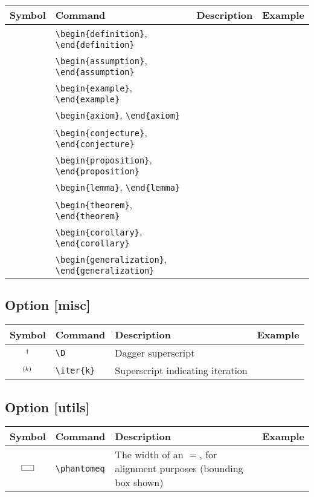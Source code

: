 \documentclass{article}
\begin{document}
\begin{tabular}{clll}
  \toprule
  Symbol & Command & Description & Example \\
  \midrule
  & \verb|\begin{definition}|, \verb|\end{definition}| & \\
  & \verb|\begin{assumption}|, \verb|\end{assumption}| & \\
  & \verb|\begin{example}|, \verb|\end{example}| & \\
  \midrule
  & \verb|\begin{axiom}|, \verb|\end{axiom}| & \\
  & \verb|\begin{conjecture}|, \verb|\end{conjecture}| & \\
  & \verb|\begin{proposition}|, \verb|\end{proposition}| & \\
  & \verb|\begin{lemma}|, \verb|\end{lemma}| & \\
  & \verb|\begin{theorem}|, \verb|\end{theorem}| & \\
  & \verb|\begin{corollary}|, \verb|\end{corollary}| & \\
  & \verb|\begin{generalization}|, \verb|\end{generalization}| & \\
  \bottomrule
\end{tabular}

\subsection*{Option [misc]}

\begin{tabular}{clll}
  \toprule
  Symbol & Command & Description & Example \\
  \midrule
  $^{\dag}$ & \verb|\D| & Dagger superscript \\
  $^{(k)}$ & \verb|\iter{k}| & Superscript indicating iteration \\
  \bottomrule
\end{tabular}

\subsection*{Option [utils]}

\begin{tabular}{clll}
  \toprule
  Symbol & Command & Description & Example \\
  \midrule
  $\fbox{\phantomeq}$ & \verb|\phantomeq| & The width of an $=$, for alignment purposes (bounding box shown) \\
  \bottomrule
\end{tabular}
\end{document}
